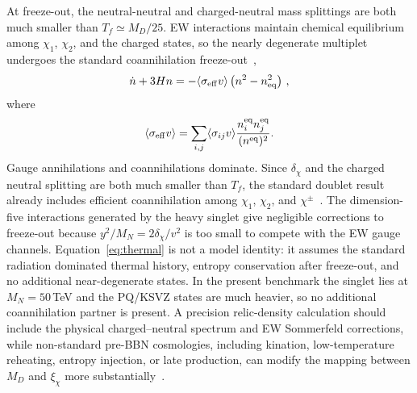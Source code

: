 \documentclass[aps,prd,reprint,preprintnumbers,superscriptaddress,nofootinbib,floatfix]{revtex4-2}
\newcommand{\dchi}{\delta_\chi}
\begin{document}
At freeze-out, the neutral-neutral and charged-neutral mass splittings are both much smaller than $T_f\simeq M_D/25$. EW interactions maintain chemical equilibrium among $\chi_1$, $\chi_2$, and the charged states, so the nearly degenerate multiplet undergoes the standard coannihilation freeze-out~\cite{Gondolo:1990dk, Griest:1990kh, Cirelli:2005uq, Nagata:2014wma},
\begin{equation}
\label{eq:boltzmann}
    \dot n+3Hn=-\langle\sigma_{\rm eff}v\rangle \left(n^2-n_{\rm eq}^2\right)\,,
\end{equation}
where
\begin{equation}
    \label{eq:sigmaeff}
    \langle\sigma_{\rm eff}v\rangle =\sum_{i,j}\langle\sigma_{ij}v\rangle \frac{n_i^{\rm eq}n_j^{\rm eq}}{(n^{\rm eq})^2}.
\end{equation}
Gauge annihilations and coannihilations dominate. Since $\dchi$ and the charged neutral splitting are both much smaller than $T_f$, the standard doublet result already includes efficient coannihilation among $\chi_1$, $\chi_2$, and $\chi^\pm$~\cite{Griest:1990kh,Gondolo:1990dk,Cirelli:2005uq,Nagata:2014wma}. The dimension-five interactions generated by the heavy singlet give negligible corrections to freeze-out because $y^2/M_N=2\dchi/v^2$ is too small to compete with the EW gauge channels. Equation~\eqref{eq:thermal} is not a model identity: it assumes the standard radiation dominated thermal history, entropy conservation after freeze-out, and no additional near-degenerate states. In the present benchmark the singlet lies at $M_N=50$\,TeV and the PQ/KSVZ states are much heavier, so no additional coannihilation partner is present. A precision relic-density calculation should include the physical charged--neutral spectrum and EW Sommerfeld corrections, while non-standard pre-BBN cosmologies, including kination, low-temperature reheating, entropy injection, or late production, can modify the mapping between $M_D$ and $\xi_\chi$ more substantially~\cite{Cirelli:2005uq, Hisano:2006nn, Nagata:2014wma, Visinelli:2015eka}.
\end{document}
